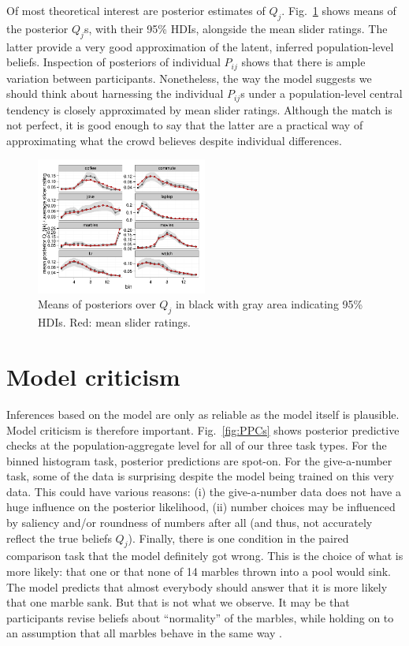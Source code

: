 \documentclass[10pt,letterpaper]{article}
\newcommand{\figref}[1]{Fig.~\ref{#1}}
\begin{document}
Of most theoretical interest are posterior estimates of $Q_j$. \figref{fig:PosteriorQj} shows
means of the posterior $Q_j$s, with their 95\% HDIs, alongside the mean slider ratings. The
latter provide a very good approximation of the latent, inferred population-level
beliefs. Inspection of posteriors of individual $P_{ij}$ shows that there is ample variation
between participants. Nonetheless, the way the model suggests we should think about harnessing
the individual $P_{ij}$s under a population-level central tendency is closely approximated by
mean slider ratings. Although the match is not perfect, it is good enough to say that the
latter are a practical way of approximating what the crowd believes despite individual
differences.

\begin{figure}
  \centering
  \includegraphics[width = 0.5\textwidth]{plots/pop_priors.pdf}
  \caption{Means of posteriors over $Q_j$ in black with gray area indicating 95\% HDIs. Red: mean slider ratings.}
  \label{fig:PosteriorQj}
\end{figure}

\section{Model criticism}

Inferences based on the model are only as reliable as the model itself is plausible. Model
criticism is therefore important. \figref{fig:PPCs} shows posterior predictive checks at the
population-aggregate level for all of our three task types. For the binned histogram task,
posterior predictions are spot-on. For the give-a-number task, some of the data is surprising
despite the model being trained on this very data. This could have various reasons: (i) the
give-a-number data does not have a huge influence on the posterior likelihood, (ii) number
choices may be influenced by saliency and/or roundness of numbers after all (and thus, not
accurately reflect the true beliefs $Q_j$). Finally, there is one condition in the paired
comparison task that the model definitely got wrong. This is the choice of what is more likely:
that one or that none of 14 marbles thrown into a pool would sink. The model predicts that
almost everybody should answer that it is more likely that one marble sank. But that is not
what we observe. It may be that participants revise beliefs about ``normality'' of the marbles,
while holding on to an assumption that all marbles behave in the same way
\cite{DegenTessler2015:Wonky-worlds:-L}.
\end{document}
